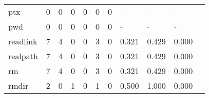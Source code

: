 \begin{longtable}{lp{1.2cm}p{1.2cm}p{1.2cm}p{1.2cm}p{1.2cm}p{1.2cm}p{1.2cm}p{1.2cm}p{1.2cm}p{1.2cm}}
ptx       &                                     0 &                                                  0 &                                                0 &                                               0 &                                                0 &                                              0 &                                                  - &                                                  - &                                                  - \\
pwd       &                                     0 &                                                  0 &                                                0 &                                               0 &                                                0 &                                              0 &                                                  - &                                                  - &                                                  - \\
readlink  &                                     7 &                                                  4 &                                                0 &                                               0 &                                                3 &                                              0 &                                              0.321 &                                              0.429 &                                              0.000 \\
realpath  &                                     7 &                                                  4 &                                                0 &                                               0 &                                                3 &                                              0 &                                              0.321 &                                              0.429 &                                              0.000 \\
rm        &                                     7 &                                                  4 &                                                0 &                                               0 &                                                3 &                                              0 &                                              0.321 &                                              0.429 &                                              0.000 \\
rmdir     &                                     2 &                                                  0 &                                                1 &                                               0 &                                                1 &                                              0 &                                              0.500 &                                              1.000 &                                              0.000 \\

\end{longtable}
